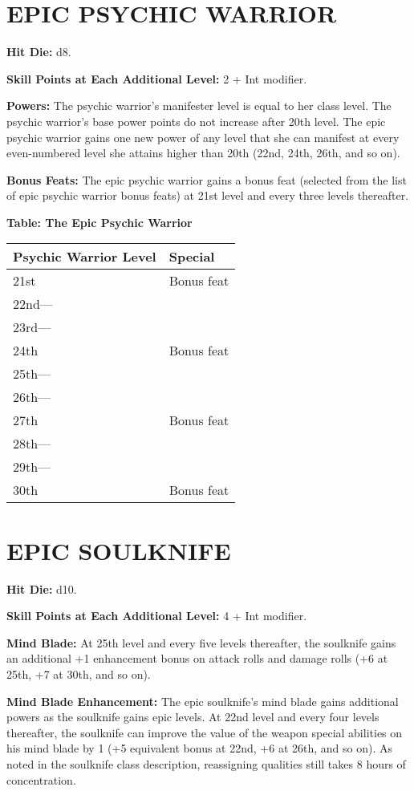 \documentclass{article}
\begin{document}
\vspace{24pt}
\section*{{\LARGE{}EPIC PSYCHIC WARRIOR}}

\textbf{Hit Die:} d8. 

\textbf{Skill Points at Each Additional Level:} 2 + Int modifier. 

\textbf{Powers:} The psychic warrior's manifester level is equal to her class level. 
The psychic warrior's base power points do not increase after 20th level. The epic 
psychic warrior gains one new power of any level that she can manifest at every 
even-numbered level she attains higher than 20th (22nd, 24th, 26th, and so on).

\textbf{Bonus Feats:} The epic psychic warrior gains a bonus feat (selected from 
the list of epic psychic warrior bonus feats) at 21st level and every three levels 
thereafter. 

\textbf{Table: The Epic Psychic Warrior }

\begin{tabular}{|>{\raggedright}p{74pt}|>{\raggedright}p{60pt}|}
\hline
P\textbf{sychic Warrior Level} & S\textbf{pecial }\tabularnewline
\hline
21st & Bonus feat \tabularnewline
\hline
22nd--- &  \tabularnewline
\hline
23rd--- &  \tabularnewline
\hline
24th & Bonus feat \tabularnewline
\hline
25th--- &  \tabularnewline
\hline
26th--- &  \tabularnewline
\hline
27th & Bonus feat \tabularnewline
\hline
28th--- &  \tabularnewline
\hline
29th--- &  \tabularnewline
\hline
30th & Bonus feat\tabularnewline
\hline
\end{tabular}

\vspace{12pt}
\section*{{\LARGE{}EPIC SOULKNIFE}}

\textbf{Hit Die:} d10.

\textbf{Skill Points at Each Additional Level:} 4 + Int modifier.

\textbf{Mind Blade: }At 25th level and every five levels thereafter, the soulknife 
gains an additional +1 enhancement bonus on attack rolls and damage rolls (+6 at 
25th, +7 at 30th, and so on).

\textbf{Mind Blade Enhancement: }The epic soulknife's mind blade gains additional 
powers as the soulknife gains epic levels. At 22nd level and every four levels 
thereafter, the soulknife can improve the value of the weapon special abilities 
on his mind blade by 1 (+5 equivalent bonus at 22nd, +6 at 26th, and so on). As 
noted in the soulknife class description, reassigning qualities still takes 8 hours 
of concentration.
\end{document}
